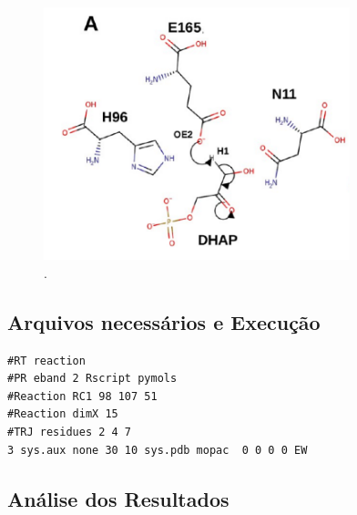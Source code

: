 \documentclass[a4paper,11pt]{refart}
\begin{document}
\hspace*{-\leftmarginwidth}
\begin{minipage}{\fullwidth}
	\begin{figure}[H]
		\begin{center}
			\includegraphics[width=3.5in]{images/tut6_img0}
			\caption{.}
			\label{fig_tut6_0}
		\end{center}
	\end{figure}
\end{minipage}

\subsection{Arquivos necessários e Execução}


\hspace*{-\leftmarginwidth}
\begin{minipage}{\fullwidth}
\begin{lstlisting}[caption={Input editado para execução do tutorial 3},label={tut402}]
#RT reaction 
#PR eband 2 Rscript pymols
#Reaction RC1 98 107 51
#Reaction dimX 15
#TRJ residues 2 4 7
3 sys.aux none 30 10 sys.pdb mopac  0 0 0 0 EW
\end{lstlisting}
\end{minipage}


\subsection{Análise dos Resultados}
\end{document}

